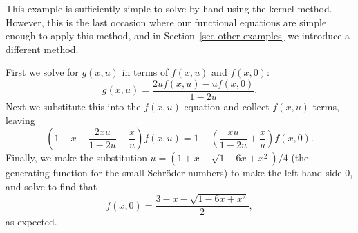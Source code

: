 \documentclass[10pt]{article}
\theoremstyle{plain}
\theoremstyle{definition}
\begin{document}
This example is sufficiently simple to solve by hand using the kernel method. However, this is the last occasion where our functional equations are simple enough to apply this method, and in Section~\ref{sec-other-examples} we introduce a different method.

First we solve for $g(x,u)$ in terms of $f(x,u)$ and $f(x,0)$:
\[
	g(x,u)=\frac{2uf(x,u)-uf(x,0)}{1-2u}.
\]
Next we substitute this into the $f(x,u)$ equation and collect $f(x,u)$ terms, leaving
\[
	\left(1-x-\frac{2xu}{1-2u}-\frac{x}{u}\right)f(x,u)
	=
	1-\left(\frac{xu}{1-2u}+\frac{x}{u}\right)f(x,0).
\]
Finally, we make the substitution $u=(1+x-\sqrt{1-6x+x^2})/4$ (the generating function for the small Schr\"oder numbers) to make the left-hand side $0$, and solve to find that
\[
	f(x,0)=\frac{3-x-\sqrt{1-6x+x^2}}{2}, %
\]
as expected.
\end{document}
